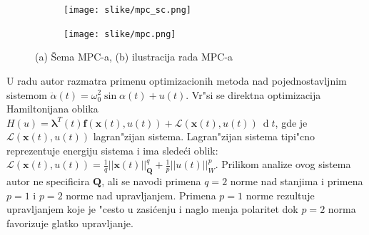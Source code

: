 \documentclass[a4paper,11pt]{article}
\theoremstyle{definition} \newtheorem{deff}{Definicija}[section]
\theoremstyle{definition} \newtheorem{prim}[deff]{Primer}
\theoremstyle{plain} \newtheorem{teor}[deff]{Teorema}
\newcommand{\vect}[1]{\boldsymbol{\mathbf{#1}}}
\begin{document}
	
	\begin{figure}[!htb]
		\centering
		\begin{subfigure}{0.5\linewidth}
			\centering
			\texttt{[image: slike/mpc\_sc.png]}
			\caption{}
			\label{fig:mpc_sc}
		\end{subfigure}
		\hfill
		\begin{subfigure}{0.48\linewidth}
			\centering
			\texttt{[image: slike/mpc.png]}
			\caption{}
			\label{fig:mpc_f}
		\end{subfigure}
		\caption{(a) Šema MPC-a, (b) ilustracija rada MPC-a \cite{mpc} }
	\end{figure}
	
	
	U radu \cite{inicijalna} autor razmatra primenu optimizacionih metoda nad pojednostavljnim sistemom $\ddot{\alpha}(t) = \omega_0^2 \operatorname{sin}\alpha(t) + u(t)$. Vr"si se direktna optimizacija Hamiltonijana oblika $H(u) = \vect{\lambda}^T(t)\vect{f}(\mathbf{x}(t), u(t)) + \mathcal{L}(\mathbf{x}(t), u(t))~\operatorname{d}t$, gde je $\mathcal{L}(\mathbf{x}(t), u(t))$ lagran"zijan sistema. Lagran"zijan sistema tipi"cno reprezentuje energiju sistema i ima slede\'ci oblik: $\mathcal{L}(\mathbf{x}(t), u(t)) = \frac{1}{q}||\mathbf{x}(t)||_{\mathbf{Q}}^q + \frac{1}{p}||u(t)||_{W}^p$. Prilikom analize ovog sistema autor ne specificira $\mathbf{Q}$, ali se navodi primena $q=2$ norme nad stanjima i primena $p=1$ i $p=2$ norme nad upravljanjem. Primena $p=1$ norme rezultuje upravljanjem koje je "cesto u zasi\'cenju i naglo menja polaritet dok $p = 2$ norma favorizuje glatko upravljanje. \\
	
\end{document}
